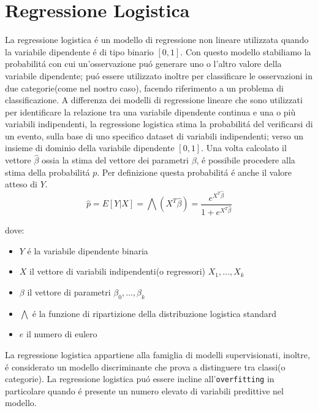 \documentclass[../../Report.tex]{subfiles}
\begin{document}
    \section{Regressione Logistica}
    La regressione logistica é un modello di regressione non lineare utilizzata quando la variabile dipendente é di tipo binario $[0,1]$.
    Con questo modello stabiliamo la probabilitá con cui un'osservazione puó generare uno o l'altro valore della variabile dipendente; puó essere utilizzato inoltre per classificare le osservazioni in due categorie(come nel nostro caso), facendo riferimento a un problema di classificazione.
    A differenza dei modelli di regressione lineare che sono utilizzati per identificare la relazione tra una variabile dipendente continua e una o più variabili indipendenti, la regressione logistica stima la probabilitá del verificarsi di un evento, sulla base di uno specifico dataset di variabili indipendenti; verso un insieme di dominio della variabile dipendente $[0,1]$.
    Una volta calcolato il vettore $\widehat{\beta}$ ossia la stima  del vettore dei parametri $\beta$, é possibile procedere alla stima della probabilitá $p$. Per definizione questa probabilitá é anche il valore atteso di $Y$.
    $$\widehat{p} = E[Y | X] = \bigwedge (X ^T \widehat{\beta}) = \frac{e^{X^T \widehat{\beta}}}{1 + e^{X^T \widehat{\beta}}}$$ 
    
    dove:
    \begin{itemize}
        \item $Y$ é la variabile dipendente binaria
        \item $X$ il vettore di variabili indipendenti(o regressori) $X_1,\dots,X_k$
        \item $\beta$ il vettore di parametri $\beta_0,\dots,\beta_k$
        \item $\bigwedge$ é la funzione di ripartizione della distribuzione logistica standard
        \item $e$ il numero di eulero
    \end{itemize}

  La regressione logistica appartiene alla famiglia di modelli supervisionati, inoltre,  é considerato un modello discriminante che prova a distinguere tra classi(o categorie).
    La regressione logistica puó essere incline all'\texttt{overfitting} in particolare quando é presente un numero elevato di variabili predittive nel modello.
\end{document}
